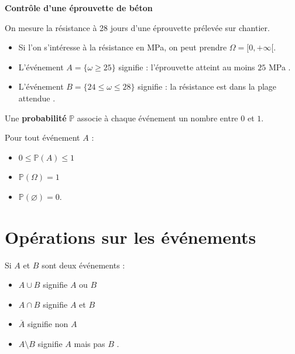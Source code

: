 \begin{Ex}
\textbf{Contrôle d'une éprouvette de béton}

On mesure la résistance à 28 jours d'une éprouvette prélevée sur chantier.
\begin{itemize}
    \item Si l'on s'intéresse à la résistance en MPa, on peut prendre $\Omega = [0,+\infty[$.
    \item L'événement $A = \{\omega \geq 25\}$ signifie : \og l'éprouvette atteint au moins $25$ MPa \fg.
    \item L'événement $B = \{24 \leq \omega \leq 28\}$ signifie : \og la résistance est dans la plage attendue \fg.
\end{itemize}
\end{Ex}

\begin{Def}
Une \textbf{probabilité} $\mathbb{P}$ associe à chaque événement un nombre entre $0$ et $1$.
\end{Def}

\begin{Prop}
Pour tout événement $A$ :
\begin{itemize}
    \item $0 \leq \mathbb{P}(A) \leq 1$  
    \item $\mathbb{P}(\Omega)=1$  
    \item $\mathbb{P}(\varnothing)=0$.
\end{itemize}
\end{Prop}


\section{Opérations sur les événements}

Si $A$ et $B$ sont deux événements :
\begin{itemize}
    \item $A \cup B$ signifie \og $A$ ou $B$ \fg{}  
    \item $A \cap B$ signifie \og $A$ et $B$ \fg{}  
    \item $\overline{A}$ signifie \og non $A$ \fg{}  
    \item $A \setminus B$ signifie \og $A$ mais pas $B$ \fg.
\end{itemize}

